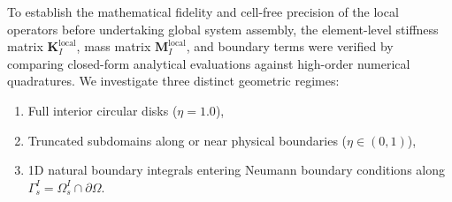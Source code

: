 \documentclass[VANCOUVER]{USG}
\begin{document}
To establish the mathematical fidelity and cell-free precision of the local operators before undertaking global system assembly, the element-level stiffness matrix $\mathbf{K}_I^{\mathrm{local}}$, mass matrix $\mathbf{M}_I^{\mathrm{local}}$, and boundary terms were verified by comparing closed-form analytical evaluations against high-order numerical quadratures. We investigate three distinct geometric regimes:
\begin{enumerate}
    \item Full interior circular disks ($\eta = 1.0$),
    \item Truncated subdomains along or near physical boundaries ($\eta \in (0, 1)$),
    \item 1D natural boundary integrals entering Neumann boundary conditions along $\Gamma_s^I = \Omega_s^I \cap \partial\Omega$.
\end{enumerate}
\end{document}
